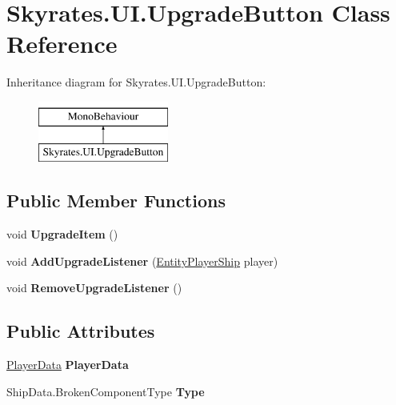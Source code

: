 \hypertarget{class_skyrates_1_1_u_i_1_1_upgrade_button}{\section{Skyrates.\-U\-I.\-Upgrade\-Button Class Reference}
\label{class_skyrates_1_1_u_i_1_1_upgrade_button}
}
Inheritance diagram for Skyrates.\-U\-I.\-Upgrade\-Button\-:\begin{figure}[H]
\begin{center}
\leavevmode
\includegraphics[height=2.000000cm]{class_skyrates_1_1_u_i_1_1_upgrade_button}
\end{center}
\end{figure}
\subsection*{Public Member Functions}
\begin{DoxyCompactItemize}
\item 
\hypertarget{class_skyrates_1_1_u_i_1_1_upgrade_button_a52c7d9590f4a7555a5f787e71219273d}{void {\bfseries Upgrade\-Item} ()}\label{class_skyrates_1_1_u_i_1_1_upgrade_button_a52c7d9590f4a7555a5f787e71219273d}

\item 
\hypertarget{class_skyrates_1_1_u_i_1_1_upgrade_button_a8bf90d38357e700e36265464fae05254}{void {\bfseries Add\-Upgrade\-Listener} (\hyperlink{class_skyrates_1_1_entity_1_1_entity_player_ship}{Entity\-Player\-Ship} player)}\label{class_skyrates_1_1_u_i_1_1_upgrade_button_a8bf90d38357e700e36265464fae05254}

\item 
\hypertarget{class_skyrates_1_1_u_i_1_1_upgrade_button_ad6c7ddb799514c482fc6dd66d34c7801}{void {\bfseries Remove\-Upgrade\-Listener} ()}\label{class_skyrates_1_1_u_i_1_1_upgrade_button_ad6c7ddb799514c482fc6dd66d34c7801}

\end{DoxyCompactItemize}
\subsection*{Public Attributes}
\begin{DoxyCompactItemize}
\item 
\hypertarget{class_skyrates_1_1_u_i_1_1_upgrade_button_a8274805ed000b033f1a6305e640dc43b}{\hyperlink{class_skyrates_1_1_data_1_1_player_data}{Player\-Data} {\bfseries Player\-Data}}\label{class_skyrates_1_1_u_i_1_1_upgrade_button_a8274805ed000b033f1a6305e640dc43b}

\item 
\hypertarget{class_skyrates_1_1_u_i_1_1_upgrade_button_a675ef8bc95430f899377ce1ef2d6a4bd}{Ship\-Data.\-Broken\-Component\-Type {\bfseries Type}}\label{class_skyrates_1_1_u_i_1_1_upgrade_button_a675ef8bc95430f899377ce1ef2d6a4bd}

\end{DoxyCompactItemize}
